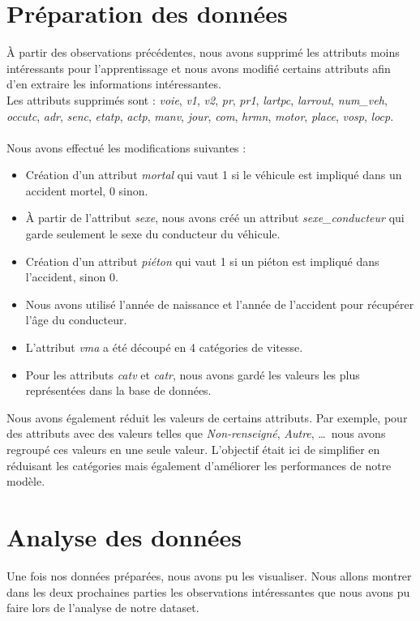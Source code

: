 \documentclass{article}
\begin{document}
    \section{Préparation des données}
    À partir des observations précédentes, nous avons supprimé les attributs moins intéressants pour l'apprentissage 
    et nous avons modifié certains attributs afin d'en extraire les informations intéressantes.
    \\
    Les attributs supprimés sont : \textit{voie}, \textit{v1}, \textit{v2}, \textit{pr}, \textit{pr1}, \textit{lartpc},
    \textit{larrout}, \textit{num\_veh}, \textit{occutc}, \textit{adr}, \textit{senc}, \textit{etatp}, \textit{actp}, 
    \textit{manv}, \textit{jour}, \textit{com}, \textit{hrmn}, \textit{motor}, \textit{place}, \textit{vosp}, \textit{locp}.
    \\\\
    Nous avons effectué les modifications suivantes :
    \begin{itemize}
        \item Création d'un attribut \textit{mortal} qui vaut 1 si le véhicule est impliqué dans un accident mortel, 0 sinon.
        \item À partir de l'attribut \textit{sexe}, nous avons créé un attribut \textit{sexe\_conducteur} qui garde seulement 
                le sexe du conducteur du véhicule.
        \item Création d'un attribut \textit{piéton} qui vaut 1 si un piéton est impliqué dans l'accident, sinon 0.
        \item Nous avons utilisé l'année de naissance et l'année de l'accident pour récupérer l'âge du conducteur.
        \item L'attribut \textit{vma} a été découpé en 4 catégories de vitesse.
        \item Pour les attributs \textit{catv} et \textit{catr}, nous avons gardé les valeurs les plus représentées dans la base de données.
    \end{itemize}
    \vspace{0.5cm}
    Nous avons également réduit les valeurs de certains attributs. Par exemple, pour des attributs 
    avec des valeurs telles que \textit{Non-renseigné}, \textit{Autre}, \dots \, nous avons regroupé 
    ces valeurs en une seule valeur. L'objectif était ici de simplifier en réduisant les catégories 
    mais également d'améliorer les performances de notre modèle.

    \section{Analyse des données}
    Une fois nos données préparées, nous avons pu les visualiser. Nous allons montrer dans les 
    deux prochaines parties les observations intéressantes que nous avons pu faire lors de 
    l'analyse de notre dataset.
    
\end{document}
